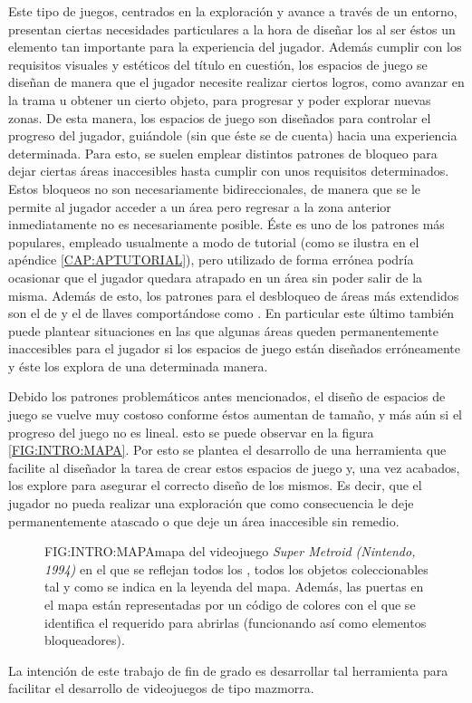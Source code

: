 Este tipo de juegos, centrados en la exploración y avance a través de un entorno, presentan ciertas necesidades particulares a la hora de diseñar los  al ser éstos un elemento tan importante para la experiencia del jugador.
Además cumplir con los requisitos visuales y estéticos del título en cuestión, los espacios de juego se diseñan de manera que el jugador necesite realizar ciertos logros, como avanzar en la trama u obtener un cierto objeto, para progresar y poder explorar nuevas zonas. De esta manera, los espacios de juego son diseñados para controlar el progreso del jugador, guiándole (sin que éste se de cuenta) hacia una experiencia determinada.\newline
Para esto, se suelen emplear distintos patrones de bloqueo para dejar ciertas áreas inaccesibles hasta cumplir con unos requisitos determinados.\newline
Estos bloqueos no son necesariamente bidireccionales, de manera que se le permite al jugador acceder a un área pero regresar a la zona anterior inmediatamente no es necesariamente posible. Éste es uno de los patrones más populares, empleado usualmente a modo de tutorial (como se ilustra en el apéndice \ref{CAP:APTUTORIAL}), pero utilizado de forma errónea podría ocasionar que el jugador quedara atrapado en un área sin poder salir de la misma.\newline
Además de esto, los patrones para el desbloqueo de áreas más extendidos son el de  y el de llaves comportándose como . En particular este último también puede plantear situaciones en las que algunas áreas queden permanentemente inaccesibles para el jugador si los espacios de juego están diseñados erróneamente y éste los explora de una determinada manera.\newline

Debido los patrones problemáticos antes mencionados, el diseño de espacios de juego se vuelve muy costoso conforme éstos aumentan de tamaño, y más aún si el progreso del juego no es lineal. esto se puede observar en la figura \ref{FIG:INTRO:MAPA}. Por esto se plantea el desarrollo de una herramienta que facilite al diseñador la tarea de crear estos espacios de juego y, una vez acabados, los explore para asegurar el correcto diseño de los mismos. Es decir, que el jugador no pueda realizar una exploración que como consecuencia le deje permanentemente atascado o que deje un área inaccesible sin remedio.

\begin{figure}{FIG:INTRO:MAPA}{mapa del videojuego \textit{Super Metroid (Nintendo, 1994)} en el que se reflejan todos los , todos los objetos coleccionables tal y como se indica en la leyenda del mapa. Además, las puertas en el mapa están representadas por un código de colores con el que se identifica el  requerido para abrirlas (funcionando así como elementos bloqueadores).}
\end{figure}

La intención de este trabajo de fin de grado es desarrollar tal herramienta para facilitar el desarrollo de videojuegos de tipo mazmorra.